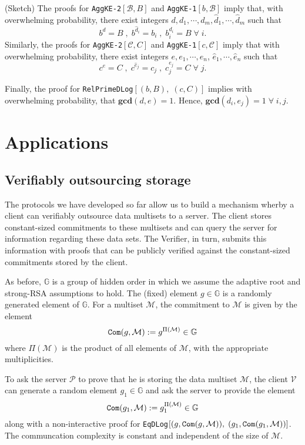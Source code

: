 \documentclass[11pt, lettersize, notitlepage, leqno, footskip=0.6cm]{article}
\newcommand{\mc}{\mathcal}
\newcommand{\mb}{\mathbb}
\newcommand{\mbf}{\mathbf}
\newcommand{\what}{\widehat}
\newcommand{\mP}{\mc{P}}
\newcommand{\V}{\mc{V}}
\newcommand{\vs}{\vspace{-0.15cm}}
\newcommand{\op}{overwhelming probability}
\newcommand{\GCD}{\mbf{gcd}}
\numberwithin{equation}{section}
\begin{document}
\begin{prf} (Sketch) The proofs for \verb|AggKE-2|$[\mc{B}, B]$ and \verb|AggKE-1|$[b,\mc{B}]$ imply that, with overwhelming probability, there exist integers $d,d_1,\cdots,d_m,\what{d}_1,\cdots,\what{d}_m$ such that \vs $$b^d = B\;,\; b^{\what{d}_i}= b_i\;,\; b_i^{d_i}= B\;\forall\; i.$$ Similarly, the proofs for \verb|AggKE-2|$[\mc{C}, C]$ and \verb|AggKE-1|$[c,\mc{C}]$ imply that with overwhelming probability, there exist integers $e,e_1,\cdots,e_n$, $\what{e}_1,\cdots,\what{e}_n$ such that \vs $$c^e = C\;,\; c^{\what{e}_j}= c_j\;,\;c_j^{e_j}= C\;\forall\; j.$$ 

Finally, the proof for \verb|RelPrimeDLog|$[(b,B),\;(c,C)]$ implies with \op, that $\GCD(d,e) = 1$. Hence, $\GCD(d_i,e_j) = 1\;\forall\;i,j$.

\end{prf}

\bigskip

\section{\fontsize{12}{12} Applications}

\subsection{\fontsize{11}{11} Verifiably outsourcing storage}

The protocols we have developed so far allow us to build a mechanism wherby a client can verifiably outsource data multisets to a server. The client stores constant-sized commitments to these multisets and can query the server for information regarding these data sets. The Verifier, in turn, submits this information with proofs that can  be publicly verified against the constant-sized commitments stored by the client.

As before, $\mb{G}$ is a group of hidden order in which we assume the adaptive root and strong-RSA assumptions to hold. The (fixed) element $g\in\mb{G}$ is a randomly generated element of $\mb{G}$. For a multiset $\mc{M}$, the commitment to $\mc{M}$ is given by the element \vs $$\protect{\verb|Com|}(g, \mc{M}):= g^{\Pi(\mc{M})}\in\mb{G}$$ where $\Pi(\mc{M})$ is the product of all elements of $\mc{M}$, with the appropriate multiplicities. 

To ask the server $\mP$ to prove that he is storing the data multiset $\mc{M}$, the client $\V$ can generate a random element $g_1\in\mb{G}$ and ask the server to provide the element \vs $$\protect{\verb|Com|}(g_1, \mc{M}):= g_1^{\Pi(\mc{M})}\in\mb{G}$$ along with a non-interactive proof for \verb|EqDLog|$[(g, \protect{\verb|Com|}(g, \mc{M})),\;(g_1, \protect{\verb|Com|}(g_1, \mc{M}))]$. The communcation complexity is constant and independent of the size of $\mc{M}$.
\end{document}

